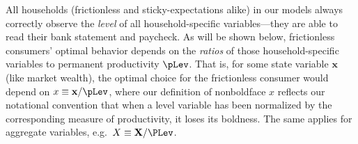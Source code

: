 All households (frictionless and sticky-expectations alike) in our models always correctly observe the \textit{level} of all household-specific variables---they are able to read their bank statement and paycheck. As will be shown below, frictionless consumers' optimal behavior depends on the {\it ratios} of those household-specific variables to permanent productivity $\pLev$.  That is, for some state variable $\textbf{x}$ (like market wealth), the optimal choice for the frictionless consumer would depend on ${x} \equiv \mathbf{x}/{\pLev}$, where our definition of nonboldface ${x}$ reflects our notational convention that when a level variable has been normalized by the corresponding measure of productivity, it loses its boldness.  The same applies for aggregate variables, e.g.\ ${X} \equiv \mathbf{X}/{\PLev}$.

\hypertarget{Why-Consumers-See-Individual-Shocks}{}
